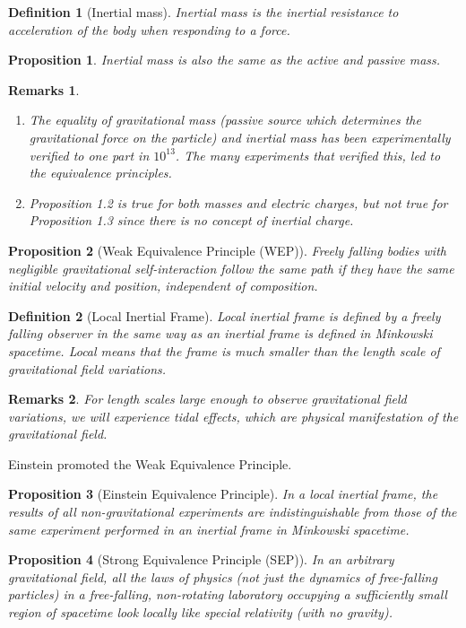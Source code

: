 \documentclass[a4paper]{article}
\newtheorem{remarks}{Remarks}[section]
\theoremstyle{new}
\newtheorem{defi}{Definition}[section]
\newtheorem{prop}{Proposition}[section]
\begin{document}
\begin{defi}[Inertial mass]
Inertial mass is the inertial resistance to acceleration of the body when responding to a force.
\end{defi}
\begin{prop}
Inertial mass is also the same as the active and passive mass.
\end{prop}
\newpage
\begin{remarks}\leavevmode
\begin{enumerate}
\item The equality of gravitational mass (passive source which determines the gravitational force on the particle) and inertial mass has been experimentally verified to one part in $10^{13}$. The many experiments that verified this, led to the equivalence principles.
\item Proposition 1.2 is true for both masses and electric charges, but not true for Proposition 1.3 since there is no concept of inertial charge.
\end{enumerate}
\end{remarks}
\begin{prop}[Weak Equivalence Principle (WEP)]
Freely falling bodies with negligible gravitational self-interaction follow the same path if they have the same initial velocity and position, independent of composition.
\end{prop}
\begin{defi}[Local Inertial Frame]
Local inertial frame is defined by a freely falling observer in the same way as an inertial frame is defined in Minkowski spacetime. Local means that the frame is much smaller than the length scale of gravitational field variations. 
\end{defi}
\begin{remarks}
For length scales large enough to observe gravitational field variations, we will experience tidal effects, which are physical manifestation of the gravitational field.
\end{remarks}
Einstein promoted the Weak Equivalence Principle.
\begin{prop}[Einstein Equivalence Principle]
In a local inertial frame, the results of all non-gravitational experiments are indistinguishable from those of the same experiment performed in an inertial frame in Minkowski spacetime.
\end{prop}
\begin{prop}[Strong Equivalence Principle (SEP)]
In an arbitrary gravitational field, all the laws of physics (not just the dynamics of free-falling particles) in a free-falling, non-rotating laboratory occupying a
sufficiently small region of spacetime look locally like
special relativity (with no gravity).
\end{prop}
\end{document}
